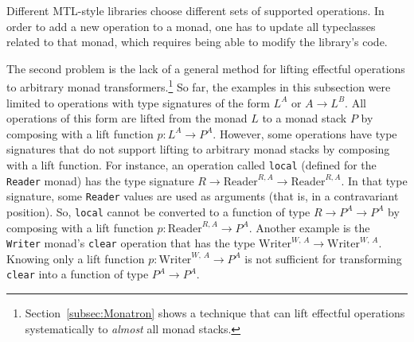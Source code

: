 Different MTL-style libraries choose different sets of supported operations.
In order to add a new operation to a monad, one has to update all
typeclasses related to that monad, which requires being able to modify
the library\textsf{'}s code.

The second problem is the lack of a general method for lifting effectful
operations to arbitrary monad transformers.\footnote{Section~\ref{subsec:Monatron} shows a technique that can lift effectful
operations systematically to \emph{almost} all monad stacks.} So far, the examples in this subsection were limited to operations
with type signatures of the form $L^{A}$ or $A\rightarrow L^{B}$.
All operations of this form are lifted from the monad $L$ to a monad
stack $P$ by composing with a lift function $p:L^{A}\rightarrow P^{A}$.
However, some operations have type signatures that do not support
lifting to arbitrary monad stacks by composing with a lift function.
For instance, an operation called \lstinline!local! (defined for
the \lstinline!Reader! monad) has the type signature $R\rightarrow\text{Reader}^{R,A}\rightarrow\text{Reader}^{R,A}$.
In that type signature, some \lstinline!Reader! values are used as
arguments (that is, in a contravariant position). So, \lstinline!local!
cannot be converted to a function of type $R\rightarrow P^{A}\rightarrow P^{A}$
by composing with a lift function $p:\text{Reader}^{R,A}\rightarrow P^{A}$.
Another example is the \lstinline!Writer! monad\textsf{'}s \lstinline!clear!
operation that has the type $\text{Writer}^{W,\,A}\rightarrow\text{Writer}^{W,\,A}$.
Knowing only a lift function $p:\text{Writer}^{W,\,A}\rightarrow P^{A}$
is not sufficient for transforming \lstinline!clear! into a function
of type $P^{A}\rightarrow P^{A}$.

